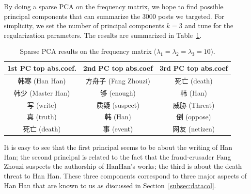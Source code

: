 \documentclass[11pt]{article}
\newcommand{\1}[1]{{\mathbf 1}\left\{#1\right\}}        %
\begin{document}
By doing a sparse PCA on the frequency matrix, we hope to find possible principal components that can summarize the 3000 posts we targeted. For simplicity, we set the number of principal components $k=3$ and tune for the regularization parameters. The results are summarized in Table~\ref{tb:spca}.

\begin{table}[htb]
\caption{Sparse PCA results on the frequency matrix ($\lambda_1=\lambda_2=\lambda_3 = 10$).}
\begin{center}
\begin{tabular}{|c|c|c|}
\hline
1st PC top abs.coef.  &  2nd PC top abs.coef   & 3rd PC top abs.coef \\ \hline
     韩寒 (Han Han)      &       方舟子 (Fang Zhouzi)    &   死亡 (death)\\ \hline
     韩少 (Master Han)   &        够 (enough)        &        韩 (Han)\\ \hline
     写 (write)         &       质疑 (suspect)        &     威胁 (Threat)\\ \hline
     真 (truth)         &         韩 (Han)         &         倒 (oppose)\\ \hline
     死亡 (death)         &       事 (event)      &         网友 (netizen)\\ \hline
\end{tabular}
\end{center}
\label{tb:spca}
\end{table}%



It is easy to see that the first principal seems to be about the writing of Han Han; the second principal is related to the fact that the fraud-crusader Fang Zhouzi suspects the authorship of HanHan's works; the third is about the death threat to Han Han. These three components correspond to three major aspects of Han Han that are known to us as discussed in Section~\ref{subsec:datacol}.


\end{document}
